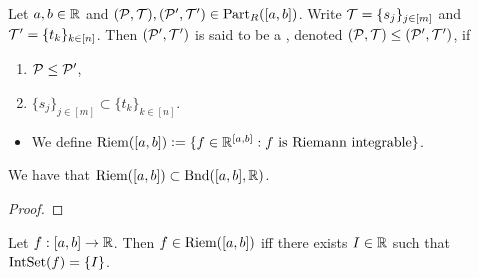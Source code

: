 \documentclass{book}
\begin{document}
	\begin{defn}  
		Let $a,b \in \mathbb{R}$ and $(\mathcal{P}, \mathcal{T}), (\mathcal{P}', \mathcal{T}') \in \text{Part}_R([a,b])$. Write $\mathcal{T}=\{s_j\}_{j \in [m]}$ and $\mathcal{T}' = \{t_k\}_{k \in [n]}$. Then $(\mathcal{P}', \mathcal{T}')$ is said to be a , denoted $(\mathcal{P}, \mathcal{T}) \leq (\mathcal{P}', \mathcal{T}')$, if  
		\begin{enumerate}
			\item $\mathcal{P} \leq \mathcal{P}'$,
			\item $\{s_j\}_{j \in [m]} \subset \{t_k\}_{k \in [n]}$.
		\end{enumerate} 
	\end{defn}
	
	\begin{defn}
		\begin{itemize}
			Let $f:[a,b] \rightarrow \R$. 
			\begin{itemize}
				\item Let $I \in \R$. Then $I$ is said to be  if for each $\ep > 0$, there exists $\del > 0$ such that for each $(\MP,\MT) \in \Part_R([a,b])$, $\mesh(\MP) < \del$ implies that $| S^f(\MP, \MT) - I| < \ep$.  
				\item We define $\IntSet(f) \subset \R$ by $\IntSet(f) \defeq \{I \in \R: \text{$I$ is a Riemann integral of $f$}\}$.
				\item Then $f$ is said to be  if $\IntSet(f) \neq \varnothing$.
			\end{itemize}
			\item We define $\text{Riem}([a,b]) \vcentcolon= \{f \in \mathbb{R}^{[a,b]}: \text{$f$ is Riemann integrable}\}$.
		\end{itemize}
	\end{defn}
	
	\begin{ex}
		We have that $\text{Riem}([a,b]) \subset \text{Bnd}([a,b], \mathbb{R})$.
	\end{ex}
	
	\begin{proof}
	\end{proof}
	
	\begin{ex}
		Let $f: [a,b] \rightarrow \R$. Then $f \in \text{Riem}([a,b])$ iff there exists $I \in \R$ such that $\text{IntSet}(f) = \{I\}$.
	\end{ex}
	
\end{document}
